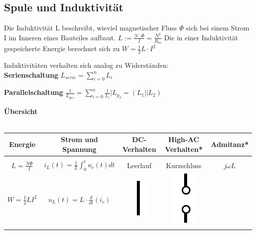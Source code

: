 \newpage

\subsection{Spule und Induktivität}

\beginip
	Die Induktivität L beschreibt, wieviel magnetischer Fluss $\Phi$ sich bei einem Strom I im Inneren eines Bauteiles aufbaut.
	\formulaBegin
	$ L := \frac{N\cdot \Phi}{I} = \frac{N^2}{R_m} $
	\formulaEnd
	Die in einer Induktivität gespeicherte Energie berechnet sich zu
	\formulaBegin
	$W =\displaystyle \frac{1}{2}L \cdot I^2$
	\formulaEnd
\iend



	 \beginip
	 	Induktivitäten verhalten sich analog zu Widerständen: \\
		\textbf{Serienschaltung}
		\formulaBegin
		$ L_{serie} = \sum_{i=0}^n L_i $
		\formulaEnd

		\textbf{Parallelschaltung}
		\formulaBegin
		$\displaystyle \frac{1}{L_{ges}} = \sum_{i=0}^n \frac{1}{L_i} \Bigg\rvert L_{p_2} = (L_1 || L_2 )$
		\formulaEnd
	 \iend


	\textbf{Übersicht} \\
	\\
	\begin{tabular}{|c|c|c|c|c|}
	\hline
		\textbf{Energie} & 	\textbf{Strom und Spannung} & 	\textbf{ DC-Verhalten} & 	\textbf{ High-AC Verhalten*}& 	\textbf{ Admitanz*} \\
		\hline 	\hline
		 & & & & \\
	    $ \displaystyle L =  \frac{N \Phi}{I} $ & $\displaystyle i_L(t) = \frac{1}{L} \int_0^t u_c(t) dt $ & Leerlauf & Kurzschluss & $ \displaystyle j\omega L$  \\
		  $\displaystyle W =  \frac{1}{2} L I^2 $ & $\displaystyle u_L(t) = L \cdot \frac{d}{d t} (i_c) $ & \includegraphics[scale=0.5]{img/kurzschluss} &   \includegraphics[scale=0.4]{img/leerlauf}  &   \\
			 & & & & \\
			\hline
	\end{tabular}

